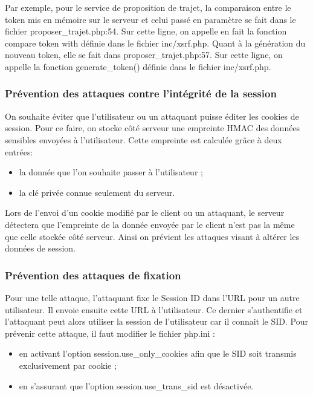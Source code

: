 \documentclass[a4paper]{article}
\begin{document}
Par exemple, pour le service de proposition de trajet, la comparaison entre
le token mis en mémoire sur le serveur et celui passé en paramètre se fait
dans le fichier proposer\_trajet.php:54. Sur cette ligne, on appelle en
fait la fonction compare token with définie dans le fichier
inc/xsrf.php. Quant à la génération du nouveau token, elle se fait dans
proposer\_trajet.php:57.  Sur cette ligne, on appelle la fonction
generate\_token() définie dans le fichier inc/xsrf.php.
 		
\subsubsection{Prévention des attaques contre l'intégrité de la session}
On souhaite éviter que l'utilisateur ou un attaquant puisse éditer les
cookies de session. Pour ce faire, on stocke côté serveur une empreinte
HMAC des données sensibles envoyées à l'utilisateur. Cette empreinte est
calculée grâce à deux entrées:

\begin{itemize}
	\item la donnée que l'on souhaite passer à l'utilisateur ;
	\item la clé privée connue seulement du serveur.
\end{itemize}

Lors de l'envoi d'un cookie modifié par le client ou un attaquant,
le serveur détectera que l'empreinte de la donnée envoyée par le client
n'est pas la même que celle stockée côté serveur. Ainsi on prévient les
attaques visant à altérer les données de session.

\subsubsection{Prévention des attaques de fixation}
Pour une telle attaque, l'attaquant fixe le Session ID dans l'URL pour
un autre utilisateur. Il envoie ensuite cette URL à l'utilisateur. Ce
dernier s'authentifie et l'attaquant peut alors utiliser la session de
l'utilisateur car il connait le SID. Pour prévenir cette attaque, il faut
modifier le fichier php.ini :

\begin{itemize}
	\item en activant l'option session.use\_only\_cookies afin que
		le SID soit transmis exclusivement par cookie ;
	\item en s'assurant que l'option session.use\_trans\_sid est désactivée.
\end{itemize}
	
\end{document}
